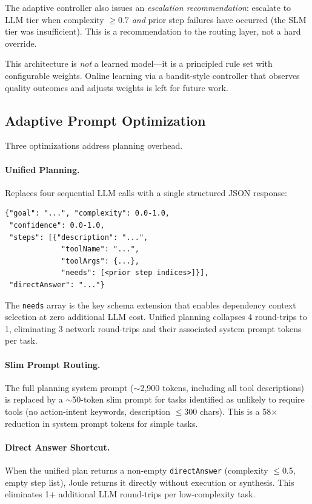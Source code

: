 \documentclass[sigconf,authordraft]{acmart}
\begin{document}
The adaptive controller also issues an \emph{escalation recommendation}: escalate to LLM tier when complexity $\geq 0.7$ \emph{and} prior step failures have occurred (the SLM tier was insufficient).
This is a recommendation to the routing layer, not a hard override.

This architecture is \emph{not} a learned model---it is a principled rule set with configurable weights.
Online learning via a bandit-style controller that observes quality outcomes and adjusts weights is left for future work.

\subsection{Adaptive Prompt Optimization}
\label{sec:prompt-opt}

Three optimizations address planning overhead.

\paragraph{Unified Planning.}
Replaces four sequential LLM calls with a single structured JSON response:

\begin{verbatim}
{"goal": "...", "complexity": 0.0-1.0,
 "confidence": 0.0-1.0,
 "steps": [{"description": "...",
             "toolName": "...",
             "toolArgs": {...},
             "needs": [<prior step indices>]}],
 "directAnswer": "..."}
\end{verbatim}

\noindent The \texttt{needs} array is the key schema extension that enables dependency context selection at zero additional LLM cost.
Unified planning collapses 4 round-trips to 1, eliminating 3 network round-trips and their associated system prompt tokens per task.

\paragraph{Slim Prompt Routing.}
The full planning system prompt ($\sim$2,900 tokens, including all tool descriptions) is replaced by a $\sim$50-token slim prompt for tasks identified as unlikely to require tools (no action-intent keywords, description $\leq$300 chars).
This is a 58$\times$ reduction in system prompt tokens for simple tasks.

\paragraph{Direct Answer Shortcut.}
When the unified plan returns a non-empty \texttt{directAnswer} (complexity $\leq$0.5, empty step list), Joule returns it directly without execution or synthesis.
This eliminates 1+ additional LLM round-trips per low-complexity task.
\end{document}
